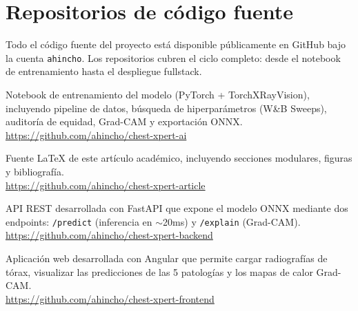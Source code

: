 \appendix
\section{Repositorios de c\'odigo fuente}
\label{sec:appendix}

Todo el c\'odigo fuente del proyecto est\'a disponible p\'ublicamente en GitHub bajo la cuenta \texttt{ahincho}. Los repositorios cubren el ciclo completo: desde el notebook de entrenamiento hasta el despliegue fullstack.

\begin{description}[leftmargin=0pt, labelindent=0pt]

    \item[\texttt{chest-xpert-ai}]
    Notebook de entrenamiento del modelo (PyTorch + TorchXRayVision), incluyendo pipeline de datos, b\'usqueda de hiperpar\'ametros (W\&B Sweeps), auditor\'ia de equidad, Grad-CAM y exportaci\'on ONNX.\\
    \url{https://github.com/ahincho/chest-xpert-ai}

    \item[\texttt{chest-xpert-article}]
    Fuente \LaTeX{} de este art\'iculo acad\'emico, incluyendo secciones modulares, figuras y bibliograf\'ia.\\
    \url{https://github.com/ahincho/chest-xpert-article}

    \item[\texttt{chest-xpert-backend}]
    API REST desarrollada con FastAPI que expone el modelo ONNX mediante dos endpoints: \texttt{/predict} (inferencia en $\sim$20ms) y \texttt{/explain} (Grad-CAM).\\
    \url{https://github.com/ahincho/chest-xpert-backend}

    \item[\texttt{chest-xpert-frontend}]
    Aplicaci\'on web desarrollada con Angular que permite cargar radiograf\'ias de t\'orax, visualizar las predicciones de las 5 patolog\'ias y los mapas de calor Grad-CAM.\\
    \url{https://github.com/ahincho/chest-xpert-frontend}

\end{description}
